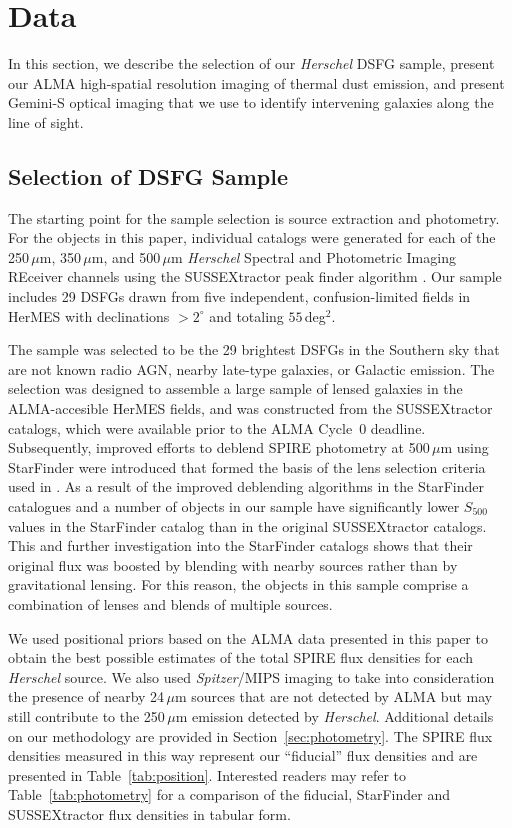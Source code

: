 \documentclass[iop]{emulateapj}
\begin{document}
\section{Data}\label{sec:obs}

In this section, we describe the selection of our {\it Herschel} DSFG sample,
present our ALMA high-spatial resolution imaging of thermal dust emission, and
present Gemini-S optical imaging that we use to identify intervening galaxies
along the line of sight.  

\subsection{Selection of DSFG Sample}\label{sec:select}

The starting point for the sample selection is source extraction and
photometry.  For the objects in this paper, individual catalogs were generated
for each of the 250$\, \mu$m, 350$\,\mu$m, and 500$\,\mu$m {\it Herschel}
Spectral and Photometric Imaging REceiver \citep[SPIRE;][]{2010A&A...518L...3G}
channels using the SUSSEXtractor peak finder algorithm \citep{Savage:2007sf}.
Our sample includes 29 DSFGs drawn from five independent, confusion-limited
fields in HerMES with declinations $> 2 ^\circ$ and totaling $55\,$deg$^2$.

The sample was selected to be the 29 brightest DSFGs in the Southern sky that
are not known radio AGN, nearby late-type galaxies, or Galactic emission. The
selection was designed to assemble a large sample of lensed galaxies in the
ALMA-accesible HerMES fields, and was constructed from the SUSSEXtractor
catalogs, which were available prior to the ALMA Cycle~0 deadline.
Subsequently, improved efforts to deblend SPIRE photometry at 500$\,\mu$m using
StarFinder \citep{Wang:2014lr} were introduced that formed the basis of the
lens selection criteria used in \citet{Wardlow:2013lr}.  As a result of the
improved deblending algorithms in the StarFinder catalogues and
\citet{Wardlow:2013lr} a number of objects in our sample have significantly
lower $S_{500}$ values in the StarFinder catalog than in the original
SUSSEXtractor catalogs.  This and further investigation into the StarFinder
catalogs shows that their original flux was boosted by blending with nearby
sources rather than by gravitational lensing.  For this reason, the objects in
this sample comprise a combination of lenses and blends of multiple sources.

We used positional priors based on the ALMA data presented in this paper to
obtain the best possible estimates of the total SPIRE flux densities for each
{\it Herschel} source.  We also used {\it Spitzer}/MIPS
\citep{2004ApJS..154...25R} imaging to take into consideration the presence of
nearby 24$\,\mu$m sources that are not detected by ALMA but may still
contribute to the 250$\,\mu$m emission detected by {\it Herschel}.  Additional
details on our methodology are provided in Section~\ref{sec:photometry}.  The
SPIRE flux densities measured in this way represent our ``fiducial'' flux
densities and are presented in Table~\ref{tab:position}.  Interested readers
may refer to Table~\ref{tab:photometry} for a comparison of the fiducial,
StarFinder and SUSSEXtractor flux densities in tabular form. 
\end{document}
